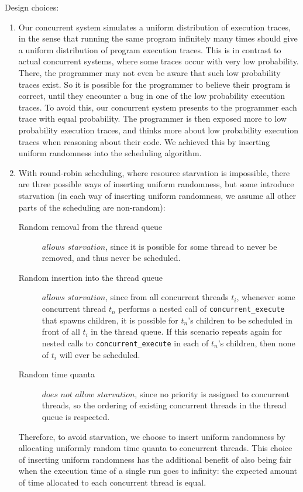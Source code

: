 Design choices:
\begin{enumerate}
\item Our concurrent system simulates a uniform distribution of execution traces, in the sense that running the same program infinitely many times should give a uniform distribution of program execution traces.
This is in contrast to actual concurrent systems, where some traces occur with very low probability. There, the programmer may not even be aware that such low probability traces exist. So it is possible for the programmer to believe their program is correct, until they encounter a bug in one of the low probability execution traces.
To avoid this, our concurrent system presents to the programmer each trace with equal probability. The programmer is then exposed more to low probability execution traces, and thinks more about low probability execution traces when reasoning about their code.
We achieved this by inserting uniform randomness into the scheduling algorithm.
\item With round-robin scheduling, where resource starvation is impossible, there are three possible ways of inserting uniform randomness, but some introduce starvation (in each way of inserting uniform randomness, we assume all other parts of the scheduling are non-random):
\begin{description}
\item[{Random removal from the thread queue}] \(\textit{allows starvation}\), since it is possible for some thread to never be removed, and thus never be scheduled.
\item[{Random insertion into the thread queue}] \(\textit{allows starvation}\), since from all concurrent threads \(t_i\), whenever some concurrent thread \(t_n\) performs a nested call of \texttt{concurrent\_execute} that spawns children, it is possible for \(t_n\)'s children to be scheduled in front of all \(t_i\) in the thread queue. If this scenario repeats again for nested calls to \texttt{concurrent\_execute} in each of \(t_n\)'s children, then none of \(t_i\) will ever be scheduled.
\item[{Random time quanta}] \(\textit{does not allow starvation}\), since no priority is assigned to concurrent threads, so the ordering of existing concurrent threads in the thread queue is respected.
\end{description}
Therefore, to avoid starvation, we choose to insert uniform randomness by allocating uniformly random time quanta to concurrent threads.
This choice of inserting uniform randomness has the additional benefit of also being fair when the execution time of a single run goes to infinity: the expected amount of time allocated to each concurrent thread is equal.
\end{enumerate}

